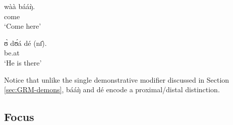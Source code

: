 \begin{exe}
\begin{exe}
\begin{exe}
{\begin{exe}
\begin{exe}
\begin{exe}
\begin{exe}
\begin{exe}
\begin{exe}
\begin{exe}
\begin{exe}
\begin{exe}
\begin{exe}
\begin{exe}
\begin{exe}
\begin{exe}
\begin{exe}
\begin{exe}
\begin{exe}
\begin{exe}
\begin{exe}
\begin{exe}
\begin{exe}
\begin{exe}
\ea\label{ex:vp}


\ea\label{ex:deic-adv-prox}
\gll wàà  bááŋ̀.\\
  come {\dem} {\postp}\\
\glt  `Come here'

 \ex\label{ex:deic-adv-dist}
\gll ʊ̀ dʊ́á dé (nɪ̄).\\
    {\psg}  be.at  {\dem}  {\postp}\\
\glt  `He is there'


\z 
 \z

Notice that unlike the single demonstrative  modifier discussed in Section 
\ref{sec:GRM-demons},   {\sls bááŋ̀} and   {\sls dé}  encode a proximal/distal distinction.



\subsection{Focus}
\label{sec:GRM-focus}


\end{exe}
\end{exe}
\end{exe}
\end{exe}
\end{exe}
\end{exe}
\end{exe}
\end{exe}
\end{exe}
\end{exe}
\end{exe}
\end{exe}
\end{exe}
\end{exe}
\end{exe}
\end{exe}
\end{exe}
\end{exe}
\end{exe}
\end{exe}
\end{exe}}
\end{exe}
\end{exe}
\end{exe}
